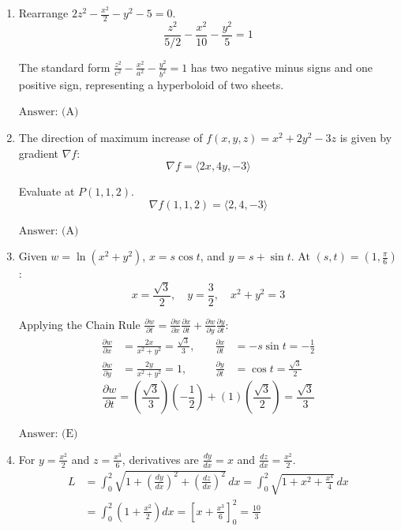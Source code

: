 \documentclass[a4paper, 12pt]{article}
\begin{document}
\begin{enumerate}[leftmargin=*,label=\textbf{\arabic*.}]
$\boxed{\text{Answer: (A)}}$

\item Rearrange $2z^2 - \frac{x^2}{2} - y^2 - 5 = 0$.
\[\frac{z^2}{5/2} - \frac{x^2}{10} - \frac{y^2}{5} = 1\]

The standard form $\frac{z^2}{c^2} - \frac{x^2}{a^2} - \frac{y^2}{b^2} = 1$ has two negative minus signs and one positive sign, representing a hyperboloid of two sheets.

$\boxed{\text{Answer: (A)}}$

\item The direction of maximum increase of $f(x,y,z) = x^2 + 2y^2 - 3z$ is given by gradient $\nabla f$:
\[\nabla f = \langle 2x, 4y, -3 \rangle\]

Evaluate at $P(1,1,2)$.
\[\nabla f(1,1,2) = \langle 2, 4, -3 \rangle\]

$\boxed{\text{Answer: (A)}}$

\item Given $w = \ln(x^2 + y^2)$, $x = s\cos t$, and $y = s + \sin t$. At $(s,t) = \left(1, \frac{\pi}{6}\right)$:
\[x = \frac{\sqrt{3}}{2}, \quad y = \frac{3}{2}, \quad x^2 + y^2 = 3\]

Applying the Chain Rule $\frac{\partial w}{\partial t} = \frac{\partial w}{\partial x}\frac{\partial x}{\partial t} + \frac{\partial w}{\partial y}\frac{\partial y}{\partial t}$:
\begin{align*}
    \frac{\partial w}{\partial x} &= \frac{2x}{x^2+y^2} = \frac{\sqrt{3}}{3}, \quad &\frac{\partial x}{\partial t} &= -s\sin t = -\frac{1}{2} \\
    \frac{\partial w}{\partial y} &= \frac{2y}{x^2+y^2} = 1, \quad &\frac{\partial y}{\partial t} &= \cos t = \frac{\sqrt{3}}{2}
\end{align*}
\[\frac{\partial w}{\partial t} = \left(\frac{\sqrt{3}}{3}\right)\left(-\frac{1}{2}\right) + (1)\left(\frac{\sqrt{3}}{2}\right) = \frac{\sqrt{3}}{3}\]

$\boxed{\text{Answer: (E)}}$

\item For $y = \frac{x^2}{2}$ and $z = \frac{x^3}{6}$, derivatives are $\frac{dy}{dx} = x$ and $\frac{dz}{dx} = \frac{x^2}{2}$.
\begin{align*}
    L &= \int_{0}^{2} \sqrt{1 + \left(\frac{dy}{dx}\right)^2 + \left(\frac{dz}{dx}\right)^2} \, dx = \int_{0}^{2} \sqrt{1 + x^2 + \frac{x^4}{4}} \, dx \\
      &= \int_{0}^{2} \left(1 + \frac{x^2}{2}\right) dx = \left[ x + \frac{x^3}{6} \right]_{0}^{2} = \frac{10}{3}
\end{align*}


\end{enumerate}
\end{document}
